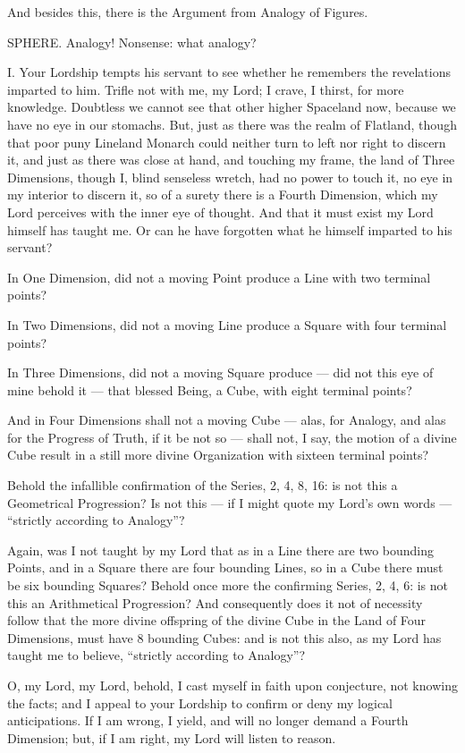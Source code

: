 \documentclass[12pt, a4paper, oneside]{memoir}
\begin{document}
And besides this, there is the Argument from Analogy of Figures.

SPHERE. Analogy! Nonsense: what analogy?

I. Your Lordship tempts his servant to see whether he remembers the
revelations imparted to him. Trifle not with me, my Lord; I crave, I thirst,
for more knowledge. Doubtless we cannot see that other higher Spaceland now,
because we have no eye in our stomachs. But, just as there was the realm of
Flatland, though that poor puny Lineland Monarch could neither turn to left
nor right to discern it, and just as there was close at hand, and touching my
frame, the land of Three Dimensions, though I, blind senseless wretch, had no
power to touch it, no eye in my interior to discern it, so of a surety there
is a Fourth Dimension, which my Lord perceives with the inner eye of thought.
And that it must exist my Lord himself has taught me. Or can he have forgotten
what he himself imparted to his servant?

In One Dimension, did not a moving Point produce a Line with two terminal
points?

In Two Dimensions, did not a moving Line produce a Square with four terminal
points?

In Three Dimensions, did not a moving Square produce --- did not this eye of
mine behold it --- that blessed Being, a Cube, with eight terminal points?

And in Four Dimensions shall not a moving Cube --- alas, for Analogy, and alas
for the Progress of Truth, if it be not so --- shall not, I say, the motion of a
divine Cube result in a still more divine Organization with sixteen terminal
points?

Behold the infallible confirmation of the Series, 2, 4,
8, 16: is not this a Geometrical Progression? Is not this --- if I might quote
my Lord's own words --- ``strictly according to Analogy''?

Again, was I not taught by my Lord that as in a Line there are two bounding
Points, and in a Square there are four bounding Lines, so in a Cube there must
be six bounding Squares? Behold once more the confirming Series, 2, 4, 6: is
not this an Arithmetical Progression? And consequently does it not of
necessity follow that the more divine offspring of the divine Cube in the Land
of Four Dimensions, must have 8 bounding Cubes: and is not this also, as my
Lord has taught me to believe, ``strictly according to Analogy''?

O, my Lord, my Lord, behold, I cast myself in faith upon conjecture, not
knowing the facts; and I appeal to your Lordship to confirm or deny my logical
anticipations. If I am wrong, I yield, and will no longer demand a Fourth
Dimension; but, if I am right, my Lord will listen to reason.
\end{document}
